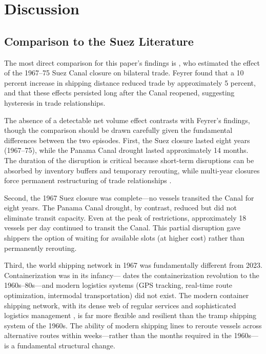 \documentclass[12pt]{article}
\begin{document}
\section{Discussion}
\label{sec:discussion}

\subsection{Comparison to the Suez Literature}

The most direct comparison for this paper's findings is \citet{feyrer2021distance}, who estimated the effect of the 1967--75 Suez Canal closure on bilateral trade. Feyrer found that a 10 percent increase in shipping distance reduced trade by approximately 5 percent, and that these effects persisted long after the Canal reopened, suggesting hysteresis in trade relationships.

The absence of a detectable net volume effect contrasts with Feyrer's findings, though the comparison should be drawn carefully given the fundamental differences between the two episodes. First, the Suez closure lasted eight years (1967--75), while the Panama Canal drought lasted approximately 14 months. The duration of the disruption is critical because short-term disruptions can be absorbed by inventory buffers and temporary rerouting, while multi-year closures force permanent restructuring of trade relationships \citep{anderson2004trade}.

Second, the 1967 Suez closure was complete---no vessels transited the Canal for eight years. The Panama Canal drought, by contrast, reduced but did not eliminate transit capacity. Even at the peak of restrictions, approximately 18 vessels per day continued to transit the Canal. This partial disruption gave shippers the option of waiting for available slots (at higher cost) rather than permanently rerouting.

Third, the world shipping network in 1967 was fundamentally different from 2023. Containerization was in its infancy---\citet{bernhofen2016estimating} dates the containerization revolution to the 1960s--80s---and modern logistics systems (GPS tracking, real-time route optimization, intermodal transportation) did not exist. The modern container shipping network, with its dense web of regular services and sophisticated logistics management \citep{cosar2022shipping}, is far more flexible and resilient than the tramp shipping system of the 1960s. The ability of modern shipping lines to reroute vessels across alternative routes within weeks---rather than the months required in the 1960s---is a fundamental structural change.
\end{document}
